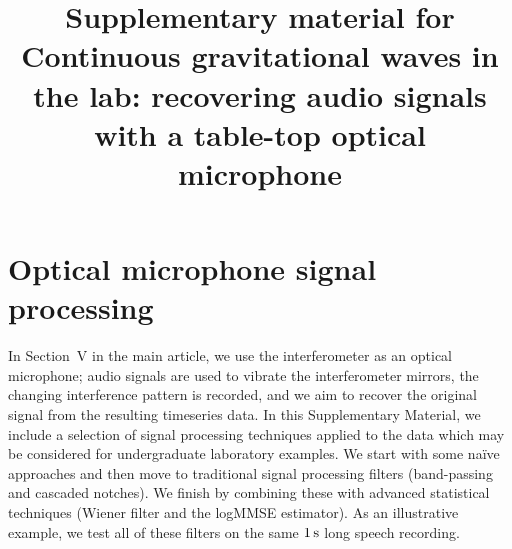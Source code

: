 \documentclass[aps,pra,superscriptaddress,reprint,nofootinbib]{revtex4-1}
\begin{document}
\title{Supplementary material for \\Continuous gravitational waves in the lab: recovering audio signals with a table-top optical microphone} 
\maketitle

\section{Optical microphone signal processing}


In Section~V in the main article, we use the interferometer as an optical microphone; audio signals are used to vibrate the interferometer mirrors, the changing interference pattern is recorded, and we aim to recover the original signal from the resulting timeseries data.
In this Supplementary Material, we include a selection of signal processing techniques applied to the data which may be considered for undergraduate laboratory examples. 
We start with some na{\"i}ve approaches and then move to traditional signal processing filters (band-passing and cascaded notches). 
We finish by combining these with advanced statistical techniques (Wiener filter and the logMMSE estimator). 
As an illustrative example, we test all of these filters on the same $1\,{\rm s}$ long speech recording.
\end{document}
